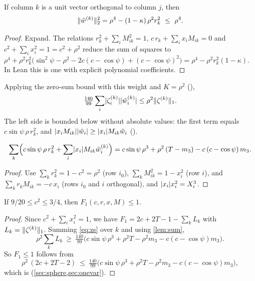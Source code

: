 \documentclass[11pt,a4paper]{article}
\begin{document}
\begin{lemma}\label{lem:norm}
If column $k$ is a unit vector orthogonal to column $j$, then
\[
\lVert \tilde w^{(k)}\rVert_2^2=\rho^4-(1-\kappa)\,\rho^2r_k^2\ \le\ \rho^4 .
\]
\end{lemma}
\begin{proof}
Expand. The relations $r_k^2+\sum_iM_{ik}^2=1$, $c\,r_k+\sum_ix_iM_{ik}=0$ and $c^2+\sum_ix_i^2=1=c^2+\rho^2$ reduce the sum of squares to $\rho^4+\rho^2r_k^2\bigl(\sin^2\psi-\rho^2-2c(c-\cos\psi)+(c-\cos\psi)^2\bigr)=\rho^4-\rho^2r_k^2(1-\kappa)$. In Lean this is one  with explicit polynomial coefficients.
\end{proof}

Applying the zero-sum bound with this weight and $K=\rho^2$ (),
\begin{equation}\label{eq:zs}
\tfrac{140}{99}\sum_{i}\lvert \zeta^{(k)}_i\rvert\lvert \tilde w^{(k)}_i\rvert\le\rho^2\lVert \zeta^{(k)}\rVert_1 .
\end{equation}
The left side is bounded below without absolute values: the first term equals $c\sin\psi\,\rho\,r_k^2$, and $\lvert x_iM_{ik}\rvert\lvert \tilde w_i\rvert\ge\lvert x_i\rvert M_{ik}\tilde w_i$ ().

\begin{lemma}\label{lem:sum}
\[
\sum_{k}\Bigl(c\sin\psi\,\rho\,r_k^2+\sum_i\lvert x_i\rvert M_{ik}\tilde w^{(k)}_i\Bigr)=c\sin\psi\,\rho^3+\rho^2\,(T-m_3)-c\,(c-\cos\psi)\,m_3 .
\]
\end{lemma}
\begin{proof}
Use $\sum_kr_k^2=1-c^2=\rho^2$ (row $i_0$), $\sum_kM_{ik}^2=1-x_i^2$ (row $i$), and $\sum_kr_kM_{ik}=-c\,x_i$ (rows $i_0$ and $i$ orthogonal), and $\lvert x_i\rvert x_i^2=X_i^3$.
\end{proof}

\begin{theorem}\label{thm:band}
If $9/20\le c^2\le3/4$, then $F_1(c,r,x,M)\le1$.
\end{theorem}
\begin{proof}
Since $c^2+\sum_ix_i^2=1$, we have $F_1=2c+2T-1-\sum_kL_k$ with $L_k=\lVert \zeta^{(k)}\rVert_1$. Summing \eqref{eq:zs} over $k$ and using \cref{lem:sum},
\[
\rho^2\sum_kL_k\ \ge\ \tfrac{140}{99}\bigl(c\sin\psi\,\rho^3+\rho^2T-\rho^2m_3-c(c-\cos\psi)m_3\bigr).
\]
So $F_1\le1$ follows from
\begin{equation}\label{eq:band}
\rho^2\,(2c+2T-2)\ \le\ \tfrac{140}{99}\bigl(c\sin\psi\,\rho^3+\rho^2T-\rho^2m_3-c(c-\cos\psi)m_3\bigr),
\end{equation}
which is  (\cref{sec:sphere,sec:onevar}).
\end{proof}
\end{document}
